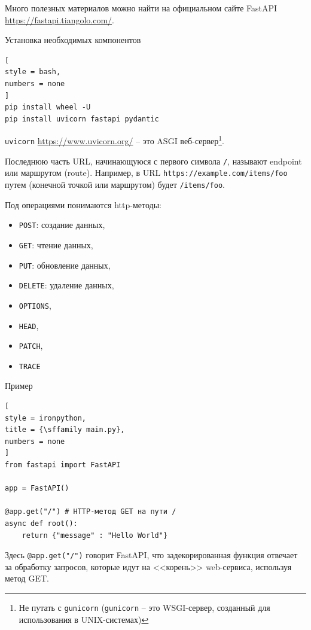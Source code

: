 \documentclass[%
	11pt,
	a4paper,
	utf8,
		]{article}
\begin{document}
Много полезных материалов можно найти на официальном сайте FastAPI \url{https://fastapi.tiangolo.com/}.

Установка необходимых компонентов
\begin{lstlisting}[
style = bash,
numbers = none	
]
pip install wheel -U
pip install uvicorn fastapi pydantic
\end{lstlisting}

\texttt{uvicorn} \url{https://www.uvicorn.org/} -- это ASGI веб-сервер\footnote{Не путать с \texttt{gunicorn} (\texttt{gunicorn} -- это WSGI-сервер, созданный для использования в UNIX-системах)}. 

Последнюю часть URL, начинающуюся с первого символа \verb|/|, называют endpoint или маршрутом (route). Например, в URL \texttt{https://example.com/items/foo} путем (конечной точкой или маршрутом) будет \texttt{/items/foo}.

Под операциями понимаются http-методы:
\begin{itemize}
	\item \texttt{POST}: создание данных,
	
	\item \texttt{GET}: чтение данных,
	
	\item \texttt{PUT}: обновление данных,
	
	\item \texttt{DELETE}: удаление данных,
	
	\item \texttt{OPTIONS},
	
	\item \texttt{HEAD},
	
	\item \texttt{PATCH},
	
	\item \texttt{TRACE}
\end{itemize}

Пример
\begin{lstlisting}[
style = ironpython,
title = {\sffamily main.py},
numbers = none
]
from fastapi import FastAPI

app = FastAPI()

@app.get("/") # HTTP-метод GET на пути /
async def root():
    return {"message" : "Hello World"}
\end{lstlisting}

Здесь \verb|@app.get("/")| говорит FastAPI, что задекорированная функция отвечает за обработку запросов, которые идут на <<корень>> web-сервиса, используя метод GET.
\end{document}

